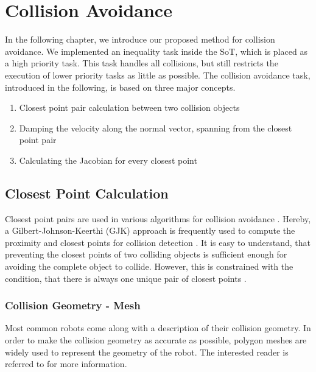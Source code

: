 \chapter{Collision Avoidance}
\label{chapter:collisionavoidance}
In the following chapter, we introduce our proposed method for collision avoidance. We implemented an inequality task inside the SoT, which is placed as a high priority task. This task handles all collisions, but still restricts the execution of lower priority tasks as little as possible. The collision avoidance task, introduced in the following, is based on three major concepts. 
\begin{enumerate}
\item Closest point pair calculation between two collision objects
\item Damping the velocity along the normal vector, spanning from the closest point pair
\item Calculating the Jacobian for every closest point
\end{enumerate}
\section{Closest Point Calculation}\label{sec:closestpoints}
Closest point pairs are used in various algorithms for collision avoidance \cite{conf/icra/DietrichWTAH11}\cite{Kanehiro-RSS08}. Hereby, a Gilbert-Johnson-Keerthi (GJK) approach is frequently used to compute the proximity and closest points for collision detection \cite{VandenBergen:1999:FRG:334709.334711}. It is easy to understand, that preventing the closest points of two colliding objects is sufficient enough for avoiding the complete object to collide. However, this is constrained with the condition, that there is always one unique pair of closest points \cite{conf/humanoids/EscandeMK07}. 
\clearpage
\subsection{Collision Geometry - Mesh}
Most common robots come along with a description of their collision geometry. In order to make the collision geometry as accurate as possible, polygon meshes are widely used to represent the geometry of the robot. The interested reader is referred to \cite{Tobler_amesh} for more information.


